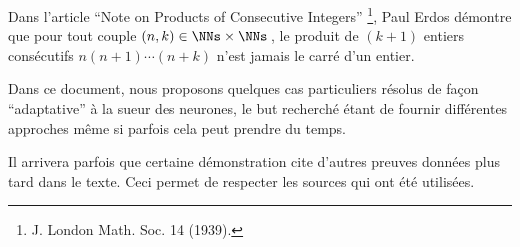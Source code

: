 Dans l'article \enquote{Note on Products of Consecutive Integers}
\footnote{
	J. London Math. Soc. 14 (1939).
},
Paul Erdos démontre que pour tout couple $(n, k) \in \NNs \times \NNs$\,, le produit de $(k+1)$ entiers consécutifs $n (n + 1) \cdots (n + k)$ n'est jamais le carré d'un entier. 

\medskip

Dans ce document, nous proposons quelques cas particuliers résolus de façon \enquote{adaptative} à la sueur des neurones, le but recherché étant de fournir différentes approches même si parfois cela peut prendre du temps.


\begin{remark}
	Il arrivera parfois que certaine démonstration cite d'autres preuves données plus tard dans le texte. Ceci permet de respecter les sources qui ont été utilisées.
\end{remark}
